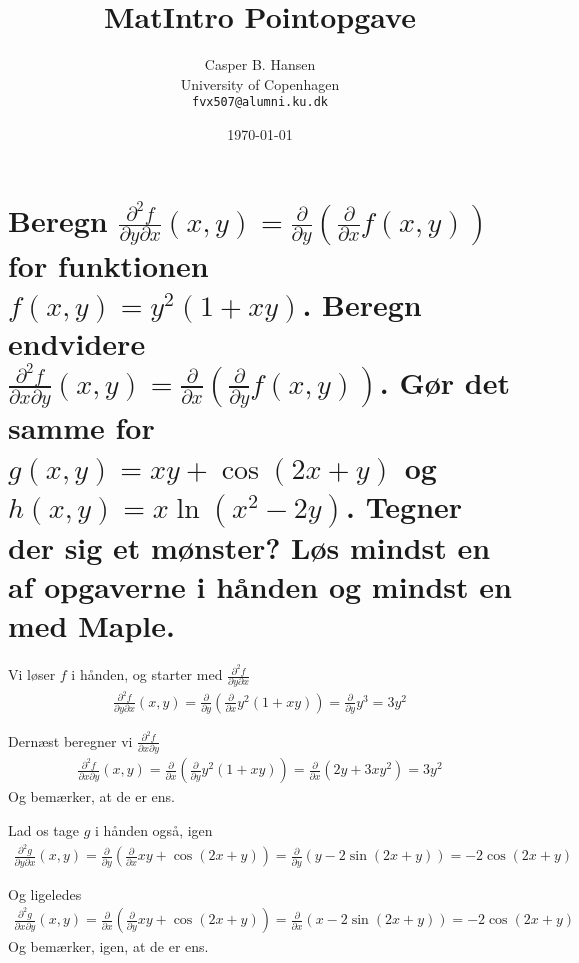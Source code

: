 \documentclass[11pt,a4paper]{article}
\title{MatIntro Pointopgave \assignmentnumber}
\author
{
    Casper B. Hansen\\
    University of Copenhagen\\
    {\tt fvx507@alumni.ku.dk}
}
\date{\today}
\begin{document}


\section
{
    \mdseries
    Beregn $\frac{\partial^2 f}{\partial y \partial x} (x,y) =
    \frac{\partial}{\partial y}
    \left( \frac{\partial}{\partial x} f(x,y) \right)$ for funktionen $f(x,y)
    = y^2 (1 + xy)$. Beregn endvidere $\frac{\partial^2 f}{\partial x \partial y}
    (x,y) = \frac{\partial}{\partial x} \left( \frac{\partial}{\partial y} f(x,y)
    \right)$. Gør det samme for $g(x,y) = xy + \cos(2x + y)$ og $h(x,y) = x \ln
    (x^2 - 2y)$. Tegner der sig et mønster? Løs mindst en af opgaverne i hånden
    og mindst en med Maple.
}
Vi løser $f$ i hånden, og starter med $\frac{\partial^2 f}{\partial y \partial x}$
\begin{align}
    \frac{\partial^2 f}{\partial y \partial x} (x,y)
    = \frac{\partial}{\partial y}
      \left( \frac{\partial}{\partial x} y^2 (1 + xy) \right)
    = \frac{\partial}{\partial y} y^3
    = 3y^2
\end{align}

Dernæst beregner vi $\frac{\partial^2 f}{\partial x \partial y}$
\begin{align}
    \frac{\partial^2 f}{\partial x \partial y} (x,y)
    = \frac{\partial}{\partial x}
      \left( \frac{\partial}{\partial y} y^2 (1 + xy) \right)
    = \frac{\partial}{\partial x} \left( 2y + 3xy^2 \right)
    = 3y^2
\end{align}
Og bemærker, at de er ens.

Lad os tage $g$ i hånden også, igen
\begin{align}
    \frac{\partial^2 g}{\partial y \partial x} (x,y)
    = \frac{\partial}{\partial y}
      \left( \frac{\partial}{\partial x} xy + \cos(2x + y) \right)
    = \frac{\partial}{\partial y} \left( y - 2 \sin(2x + y) \right)
    = -2 \cos(2x + y)
\end{align}

Og ligeledes
\begin{align}
    \frac{\partial^2 g}{\partial x \partial y} (x,y)
    = \frac{\partial}{\partial x}
      \left( \frac{\partial}{\partial y} xy + \cos(2x + y) \right)
    = \frac{\partial}{\partial x} \left( x - 2 \sin(2x + y) \right)
    = -2 \cos(2x + y)
\end{align}
Og bemærker, igen, at de er ens.
\end{document}
